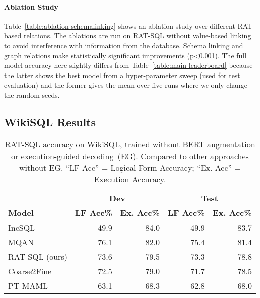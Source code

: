 \documentclass[11pt,a4paper,final]{article}
\begin{document}
\paragraph{Ablation Study}
Table~\ref{table:ablation-schemalinking} shows an ablation study over different RAT-based relations.
The ablations are run on RAT-SQL without value-based linking to avoid interference with information from the database.
Schema linking and graph relations make statistically significant improvements (p<0.001).
The full model accuracy here slightly differs from Table~\ref{table:main-leaderboard} because
the latter shows the best model from a hyper-parameter sweep (used for test evaluation) and the former gives
the mean over five runs where we only change the random seeds.


\subsection{WikiSQL Results}
\label{sec:wikisql}

\begin{table*}
    \centering
    \small
    \begin{tabular}{lrrrr}
        \toprule
        & \multicolumn{2}{c}{\bfseries Dev} & \multicolumn{2}{c}{\bfseries Test} \\
        \cmidrule{2-5}
        \bfseries Model & \bfseries LF Acc\% & \bfseries Ex. Acc\% & \bfseries LF Acc\% & \bfseries Ex. Acc\% \\
        \midrule
        IncSQL~\citep{shiIncSQLTrainingIncremental2018} & 49.9 & 84.0 & 49.9 & 83.7 \\
        MQAN~\citep{mccann2018natural} & 76.1 & 82.0 & 75.4 & 81.4 \\
        RAT-SQL (ours) & 73.6 & 79.5 & 73.3 & 78.8 \\
        Coarse2Fine~\citep{dongCoarsetoFineDecodingNeural2018} & 72.5 & 79.0 & 71.7 & 78.5 \\
        PT-MAML~\citep{huang2018natural} & 63.1 & 68.3 & 62.8 & 68.0 \\
        \bottomrule
    \end{tabular}
    \caption{
        RAT-SQL accuracy on WikiSQL, trained without BERT augmentation or execution-guided decoding~(EG).
        Compared to other approaches without EG.
        ``LF Acc'' = Logical Form Accuracy; ``Ex. Acc'' = Execution Accuracy.
    }
    \label{tab:wikisql}
    \vspace{-\baselineskip}
\end{table*}
\end{document}
